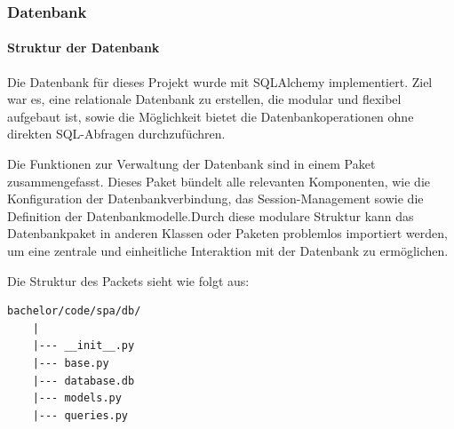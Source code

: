 \documentclass[12pt, letterpaper]{article}
\begin{document}
  \subsubsection{Datenbank}
  \paragraph{Struktur der Datenbank}
  \par \textbf{}
  \par Die Datenbank für dieses Projekt wurde mit SQLAlchemy implementiert. Ziel war es, eine relationale Datenbank zu erstellen, die modular und flexibel aufgebaut ist, sowie die Möglichkeit bietet die Datenbankoperationen ohne direkten SQL-Abfragen durchzufüchren.
  \par Die Funktionen zur Verwaltung der Datenbank sind in einem Paket zusammengefasst. Dieses Paket bündelt alle relevanten Komponenten, wie die Konfiguration der Datenbankverbindung, das Session-Management sowie die Definition der Datenbankmodelle.Durch diese modulare Struktur kann das Datenbankpaket in anderen Klassen oder Paketen problemlos importiert werden, um eine zentrale und einheitliche Interaktion mit der Datenbank zu ermöglichen.
  \par Die Struktur des Packets sieht wie folgt aus:
  \begin{Verbatim}[frame=single]
    bachelor/code/spa/db/
    |
    |--- __init__.py
    |--- base.py
    |--- database.db
    |--- models.py
    |--- queries.py
  \end{Verbatim}
  
\end{document}
